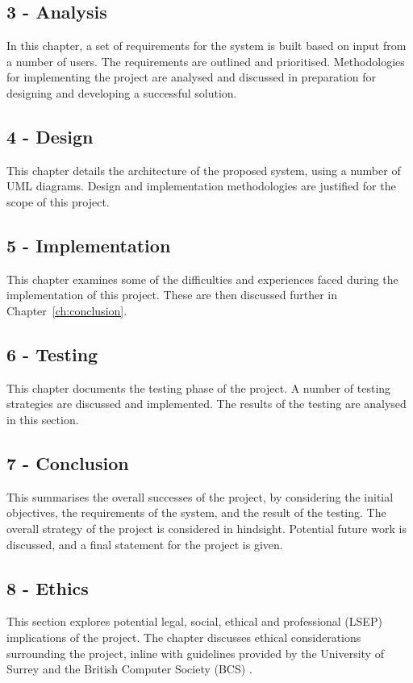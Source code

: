 \subsection*{3 - Analysis}
In this chapter, a set of requirements for the system is built based on input from a number of users. The requirements are outlined and prioritised. Methodologies for implementing the project are analysed and discussed in preparation for designing and developing a successful solution.

\subsection*{4 - Design}
This chapter details the architecture of the proposed system, using a number of UML diagrams. Design and implementation methodologies are justified for the scope of this project.

\subsection*{5 - Implementation}
This chapter examines some of the difficulties and experiences faced during the implementation of this project. These are then discussed further in Chapter~\ref{ch:conclusion}.

\subsection*{6 - Testing}
This chapter documents the testing phase of the project. A number of testing strategies are discussed and implemented. The results of the testing are analysed in this section.

\subsection*{7 - Conclusion}
This summarises the overall successes of the project, by considering the initial objectives, the requirements of the system, and the result of the testing. The overall strategy of the project is considered in hindsight. Potential future work is discussed, and a final statement for the project is given.

\subsection*{8 - Ethics}
This section explores potential legal, social, ethical and professional (LSEP) implications of the project. The chapter discusses ethical considerations surrounding the project, inline with guidelines provided by the University of Surrey \cite{surreyethics} and the British Computer Society (BCS) \cite{bcs2019conduct}.

